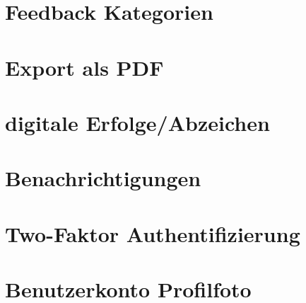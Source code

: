 \section{Feedback Kategorien}
\section{Export als PDF}
\section{digitale Erfolge/Abzeichen}
\section{Benachrichtigungen}
\section{Two-Faktor Authentifizierung}
\section{Benutzerkonto Profilfoto}